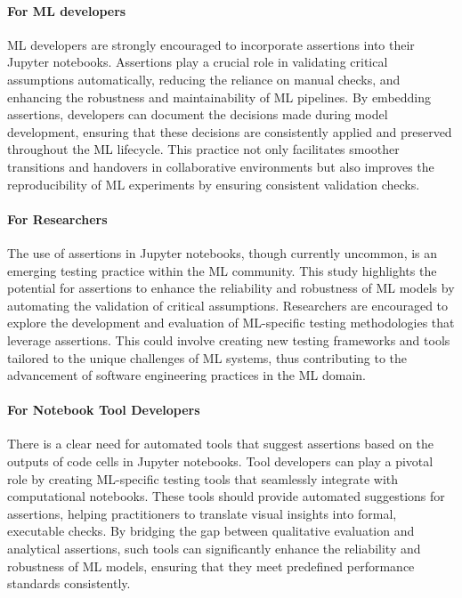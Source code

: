 \paragraph{\textbf{For ML developers}} ML developers are strongly encouraged to incorporate assertions into their Jupyter notebooks. Assertions play a crucial role in validating critical assumptions automatically, reducing the reliance on manual checks, and enhancing the robustness and maintainability of ML pipelines. By embedding assertions, developers can document the decisions made during model development, ensuring that these decisions are consistently applied and preserved throughout the ML lifecycle. This practice not only facilitates smoother transitions and handovers in collaborative environments but also improves the reproducibility of ML experiments by ensuring consistent validation checks.

\paragraph{\textbf{For Researchers}} The use of assertions in Jupyter notebooks, though currently uncommon, is an emerging testing practice within the ML community. This study highlights the potential for assertions to enhance the reliability and robustness of ML models by automating the validation of critical assumptions. Researchers are encouraged to explore the development and evaluation of ML-specific testing methodologies that leverage assertions. This could involve creating new testing frameworks and tools tailored to the unique challenges of ML systems, thus contributing to the advancement of software engineering practices in the ML domain.

\paragraph{\textbf{For Notebook Tool Developers}} There is a clear need for automated tools that suggest assertions based on the outputs of code cells in Jupyter notebooks. Tool developers can play a pivotal role by creating ML-specific testing tools that seamlessly integrate with computational notebooks. These tools should provide automated suggestions for assertions, helping practitioners to translate visual insights into formal, executable checks. By bridging the gap between qualitative evaluation and analytical assertions, such tools can significantly enhance the reliability and robustness of ML models, ensuring that they meet predefined performance standards consistently.

